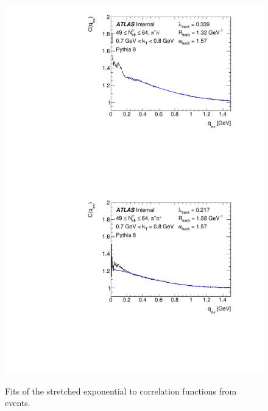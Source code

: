 \begin{figure}[t]
\begin{minipage}[t]{1.0\textwidth}
\includegraphics[width=.49\linewidth]{Cqinv_pythia_cent3_e0_kt6.pdf}
\includegraphics[width=.49\linewidth]{Cqinv_pythia_cent3_e1_kt6.pdf}\\
\end{minipage}
\caption{Fits of the stretched exponential to correlation functions from \PYEight events.}
\label{fig:pythia_bckg_fit_cent3}
\end{figure}

